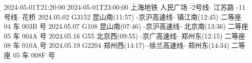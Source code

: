2024-05-01T21:20:00 2024-05-01T23:00:00 上海地铁 人民广场 -2号线- 江苏路 -11号线- 花桥
2024.05.02 G3152 昆山南(11:57) -京沪高速线- 镇江南(12:45) 二等座 04 车 003B 号
2024.05.07 G108  昆山南(07:46) -京沪高速线- 北京南(13:36) 二等座 05 车 004A 号
2024.05.16 G55   北京西(09:55) -京广高速线- 郑州东(12:15) 二等座 08 车 010A 号
2024.05.19 G2204 郑州西(14:17) -徐兰高速线- 郑州东(14:34) 二等座 05 车 008F 号




